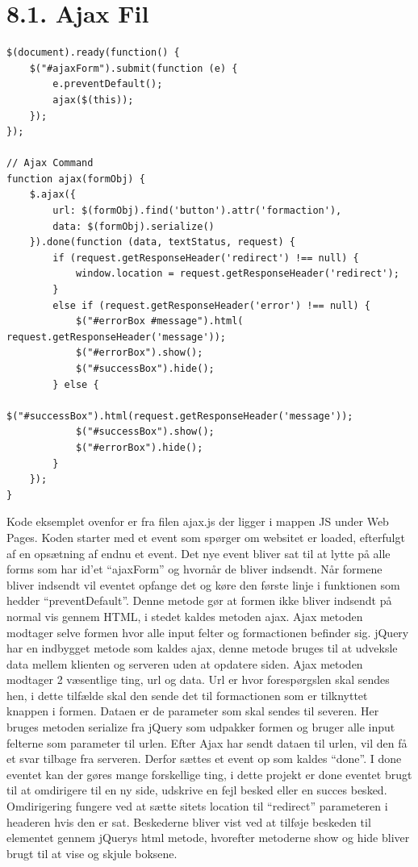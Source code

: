 \documentclass[11pt]{report}
\begin{document}
\section*{8.1. Ajax Fil}
\begin{lstlisting}
$(document).ready(function() {
    $("#ajaxForm").submit(function (e) {
        e.preventDefault();
        ajax($(this));
    });
});

// Ajax Command
function ajax(formObj) {
    $.ajax({
        url: $(formObj).find('button').attr('formaction'),
        data: $(formObj).serialize()
    }).done(function (data, textStatus, request) {
        if (request.getResponseHeader('redirect') !== null) {
            window.location = request.getResponseHeader('redirect');
        }
        else if (request.getResponseHeader('error') !== null) {
            $("#errorBox #message").html( 
request.getResponseHeader('message'));
            $("#errorBox").show();
            $("#successBox").hide();
        } else {
            $("#successBox").html(request.getResponseHeader('message'));
            $("#successBox").show();
            $("#errorBox").hide();
        }
    });
}
\end{lstlisting}
Kode eksemplet ovenfor er fra filen ajax.js der ligger i mappen JS under Web Pages. Koden starter med et event som spørger om websitet er loaded, efterfulgt af en opsætning af endnu et event. Det nye event bliver sat til at lytte på alle forms som har id’et “ajaxForm” og hvornår de bliver indsendt. Når formene bliver indsendt vil eventet opfange det og køre den første linje i funktionen som hedder “preventDefault”. Denne metode gør at formen ikke bliver indsendt på normal vis gennem HTML, i stedet kaldes metoden ajax. Ajax metoden modtager selve formen hvor alle input felter og formactionen befinder sig.
jQuery har en indbygget metode som kaldes ajax, denne metode bruges til at udveksle data mellem klienten og serveren uden at opdatere siden. Ajax metoden modtager 2 væsentlige ting, url og data. Url er hvor forespørgslen skal sendes hen, i dette tilfælde skal den sende det til formactionen som er tilknyttet knappen i formen. Dataen er de parameter som skal sendes til severen. Her bruges metoden serialize fra jQuery som udpakker formen og bruger alle input felterne som parameter til urlen. 
Efter Ajax har sendt dataen til urlen, vil den få et svar tilbage fra
serveren. Derfor sættes et event op som kaldes “done”.  I done eventet
kan der gøres mange forskellige ting, i dette projekt er done eventet
brugt til at omdirigere til en ny side, udskrive en fejl besked eller
en succes besked. Omdirigering fungere ved at sætte sitets location
til “redirect” parameteren i headeren hvis den er sat. Beskederne
bliver vist ved at tilføje beskeden til elementet gennem jQuerys html
metode, hvorefter metoderne show og hide bliver brugt til at vise og
skjule boksene. \\\\
\end{document}
